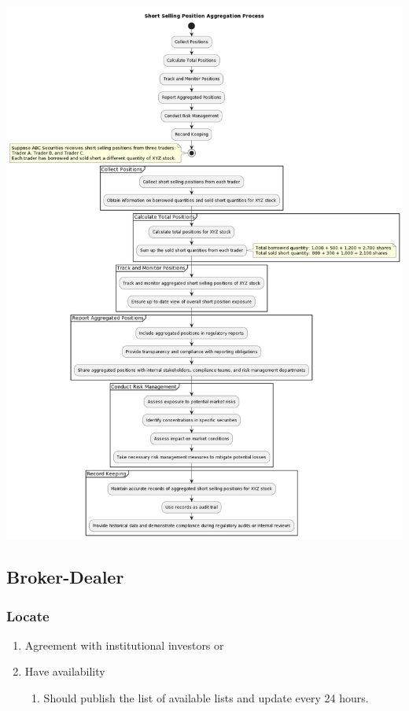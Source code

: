 \documentclass[11pt]{article}
\begin{document}
\begin{center}
\includegraphics[width=.9\linewidth]{./SS_Aggregation_Positions_process.png}
\end{center}

\subsection{Broker-Dealer}
\label{sec:org03caed9}
\subsubsection{Locate}
\label{sec:org5f674c0}
\begin{enumerate}
\item Agreement with institutional investors
\label{sec:org6a18839}
or
\item Have availability
\label{sec:org6a9b6da}
\begin{enumerate}
\item Should publish the list of available lists and update every 24 hours.
\label{sec:org3b558c7}
\end{enumerate}
\end{enumerate}
\end{document}
